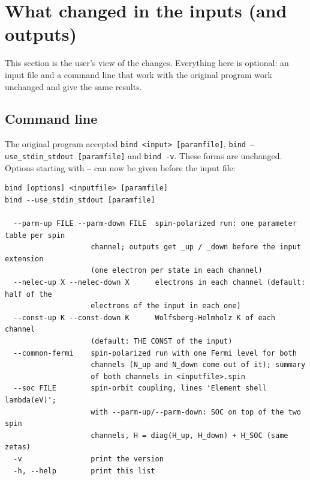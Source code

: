 \documentclass[11pt,a4paper]{article}
\begin{document}
\section{What changed in the inputs (and outputs)}\label{sec:inputs}

This section is the user's view of the changes. Everything here is optional: an input
file and a command line that work with the original program work unchanged and give the
same results.

\subsection{Command line}

The original program accepted \texttt{bind <input> [paramfile]},
\texttt{bind --use\_stdin\_stdout [paramfile]} and \texttt{bind -v}. These forms are
unchanged. Options starting with \texttt{--} can now be given before the input file:

\begin{lstlisting}[style=sh]
bind [options] <inputfile> [paramfile]
bind --use_stdin_stdout [paramfile]

  --parm-up FILE --parm-down FILE  spin-polarized run: one parameter table per spin
                    channel; outputs get _up / _down before the input extension
                    (one electron per state in each channel)
  --nelec-up X --nelec-down X      electrons in each channel (default: half of the
                    electrons of the input in each one)
  --const-up K --const-down K      Wolfsberg-Helmholz K of each channel
                    (default: THE CONST of the input)
  --common-fermi    spin-polarized run with one Fermi level for both
                    channels (N_up and N_down come out of it); summary
                    of both channels in <inputfile>.spin
  --soc FILE        spin-orbit coupling, lines 'Element shell lambda(eV)';
                    with --parm-up/--parm-down: SOC on top of the two spin
                    channels, H = diag(H_up, H_down) + H_SOC (same zetas)
  -v                print the version
  -h, --help        print this list
\end{lstlisting}
\end{document}
